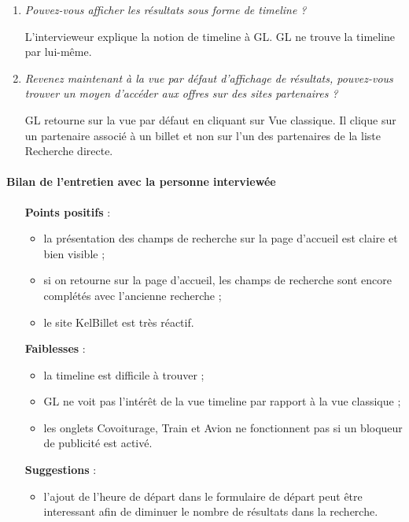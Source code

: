 \begin{enumerate}
\item \textit{Pouvez-vous afficher les r\'{e}sultats sous forme de timeline ?}

L'intervieweur explique la notion de timeline \`{a} GL.
GL ne trouve la timeline par lui-m\^{e}me.


\item \textit{Revenez maintenant \`{a} la vue par d\'{e}faut d'affichage de r\'{e}sultats, pouvez-vous trouver un moyen d'acc\'{e}der aux offres sur des sites partenaires ?}

GL retourne sur la vue par d\'{e}faut en cliquant sur \og{}Vue classique\fg{}. 
Il clique sur un partenaire associ\'{e} \`{a} un billet et non sur l'un des partenaires de la liste \og{}Recherche directe\fg{}.


\end{enumerate}

\paragraph{Bilan de l'entretien avec la personne interview\'{e}e}

\begin{itemize}
	\item [\textbf{Points positifs}] :
  		\begin{itemize}
  			\item la pr\'{e}sentation des champs de recherche sur la page d'accueil est claire et bien visible ;
			\item si on retourne sur la page d'accueil, les champs de recherche sont encore compl\'{e}t\'{e}s avec l'ancienne recherche ;
			\item le site KelBillet est tr\`{e}s r\'{e}actif.
		\end{itemize}
	\item [\textbf{Faiblesses}] :
		\begin{itemize}
			\item la timeline est difficile \`{a} trouver ;
			\item GL ne voit pas l'int\'{e}r\^{e}t de la vue timeline par rapport \`{a} la vue classique ;
			\item les onglets \og{}Covoiturage\fg{}, \og{}Train\fg{} et \og{}Avion\fg{} ne fonctionnent pas si un bloqueur de publicit\'{e} est activ\'{e}. 
		\end{itemize}
	\item [\textbf{Suggestions}] :
		\begin{itemize}
			\item l'ajout de l'heure de d\'{e}part dans le formulaire de d\'{e}part peut \^{e}tre interessant afin de diminuer le nombre de r\'{e}sultats dans la recherche.
		\end{itemize}
\end{itemize}




